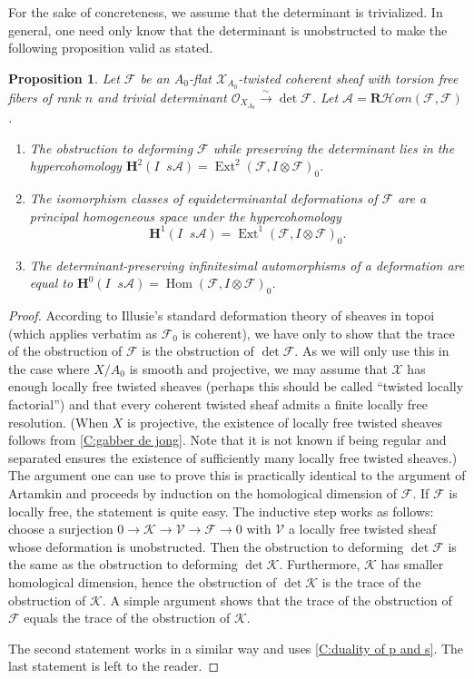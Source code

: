 \documentclass[11pt]{amsart}
\newcommand{\field}[1]{\mathbf #1}
\newcommand{\ms}[1]{\mathscr #1}
\newcommand{\simto}{\stackrel{\sim}{\to}}
\renewcommand{\hom}{\operatorname{Hom}}
\newcommand{\shom}{\ms H\!om}
\newcommand{\rshom}{\mathbf{R}\shom}
\newcommand{\bH}{\mathbf{H}}
\DeclareMathOperator{\ext}{\operatorname{Ext}}
\renewcommand{\[}{[\!\hspace{0.03em}[}
\renewcommand{\]}{]\!\hspace{0.03em}]}
\renewcommand{\(}{(\!\hspace{0.03em}(}
\renewcommand{\)}{)\!\hspace{0.03em})}
\DeclareMathOperator*{\tensor}{\otimes}
\DeclareMathOperator*{\ltensor}{\stackrel{\field L}{\otimes}}
\newtheorem{prop}[lem]{Proposition}
\theoremstyle{definition}
\theoremstyle{remark}
\begin{document}
For the sake of concreteness, we assume that the determinant is 
trivialized.  In general, one need only know that the determinant is 
unobstructed to make the following proposition valid as stated.

\begin{prop}\label{P:equideterminantal deformations} Let $\ms F$ be an $A_{0}$-flat 
$\ms X_{A_{0}}$-twisted coherent sheaf with torsion free fibers of rank $n$ and trivial 
determinant ${\ms O}_{X_{A_{0}}}\simto\det\ms F$.  Let $\ms A=\rshom(\ms 
F,\ms F)$.
\begin{enumerate}
    \item The obstruction to deforming $\ms F$ while preserving the 
determinant lies in the hypercohomology $\bH^{2}(I\ltensor s\ms 
A)=\ext^{2}(\ms F,I\tensor\ms F)_{0}$.

    \item The isomorphism classes of equideterminantal deformations of $\ms F$ are a 
    principal homogeneous space under the hypercohomology 
    $$\bH^{1}(I\ltensor s\ms A)=\ext^{1}(\ms F,I\tensor\ms F)_{0}.$$
    
    \item The 
    determinant-preserving infinitesimal automorphisms of a deformation 
    are equal to $\bH^{0}(I\ltensor s\ms A)=\hom(\ms F,I\tensor\ms 
    F)_{0}$.
\end{enumerate} 
\end{prop}
\begin{proof} According to Illusie's standard deformation theory of sheaves 
in topoi (which applies verbatim as $\ms F_{0}$ is coherent), we have only to show that 
the trace of the obstruction of $\ms F$ is the obstruction of 
$\det\ms F$.  As we will only use this in the case where $X/A_{0}$ is 
smooth and projective, we may assume that $\ms X$ has enough locally free twisted sheaves (perhaps this should be called ``twisted locally factorial'') and that every coherent twisted sheaf admits a finite locally free resolution.  (When $X$ is projective, the existence of locally free twisted sheaves follows from \ref{C:gabber 
de jong}.  Note that it is not known if being regular and separated ensures the existence of sufficiently many locally free twisted sheaves.)  The argument one can use to prove this is 
practically identical to the argument of Artamkin \cite{artamkin} and 
proceeds by induction on the homological dimension of $\ms F$.  If 
$\ms F$ is locally free, the statement is quite easy.  The inductive 
step works as follows: choose a surjection $0\to\ms K\to \ms V\to\ms F\to 0$ 
with $\ms V$ a locally free twisted sheaf whose deformation is 
unobstructed.  Then the obstruction to deforming $\det\ms F$ is the 
same as the obstruction to deforming $\det\ms K$.  Furthermore, $\ms 
K$ has smaller homological dimension, hence the obstruction of 
$\det\ms K$ is the trace of the obstruction of $\ms K$.  A simple 
argument shows that the trace of the obstruction of $\ms F$ equals the 
trace of the obstruction of $\ms K$.

The second statement works in a similar way and uses \ref{C:duality of 
p and s}.  The last statement is left to the reader.
\end{proof}
\end{document}

